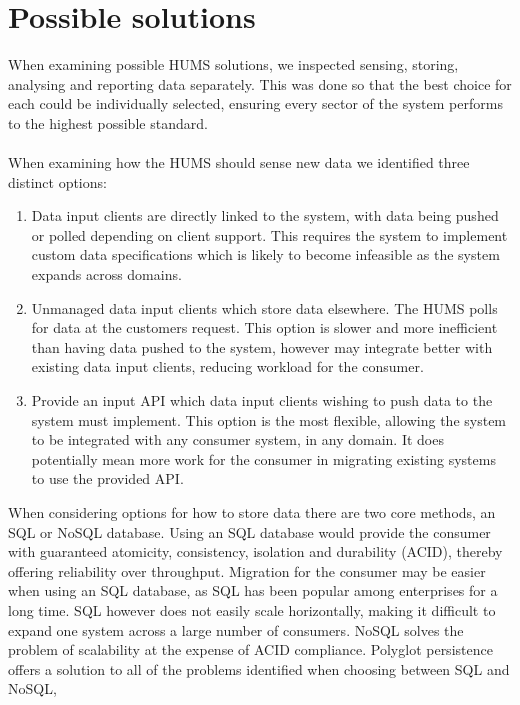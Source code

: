 \documentclass[10pt,a4paper]{article}
\begin{document}




\section{Possible solutions}
When examining possible HUMS solutions, we inspected sensing, storing, analysing
and reporting data separately. This was done so that the best choice for each
could be individually selected, ensuring every sector of the system performs to
the highest possible standard. 
\\ \\
When examining how the HUMS should sense new data we identified three distinct
options:
\begin{enumerate}
\item Data input clients are directly linked to the system, with data being
pushed or polled depending on client support. This requires the system to
implement custom data specifications which is likely to become infeasible as the
system expands across domains.
\item Unmanaged data input clients which store data elsewhere. The HUMS polls
for data at the customers request. This option is slower and more inefficient
than having data pushed to the system, however may integrate better with
existing data input clients, reducing workload for the consumer.
\item Provide an input API which data input clients wishing to push data to the
system must implement. This option is the most flexible, allowing the system to
be integrated with any consumer system, in any domain. It does potentially mean
more work for the consumer in migrating existing systems to use the provided
API. \\
\end{enumerate}
When considering options for how to store data there are two core methods, an
SQL or NoSQL database. Using an SQL database would provide the consumer with
guaranteed atomicity, consistency, isolation and durability (ACID), thereby
offering reliability over throughput. Migration for the consumer may be easier
when using an SQL database, as SQL has been popular among enterprises for a long
time. SQL however does not easily scale horizontally, making it difficult to
expand one system across a large number of consumers. NoSQL solves the problem
of scalability at the expense of ACID compliance. Polyglot persistence offers a
solution to all of the problems identified when choosing between SQL and NoSQL,
\end{document}
